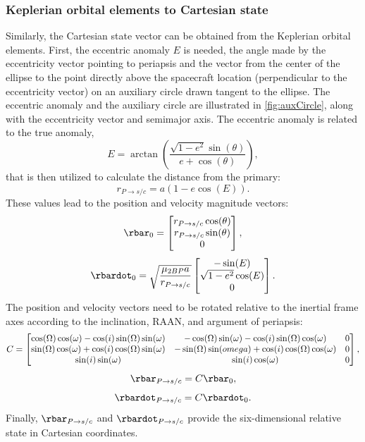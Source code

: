 \subsubsection{Keplerian orbital elements to Cartesian state}
Similarly, the Cartesian state vector can be obtained from the Keplerian orbital elements. First,
the eccentric anomaly $E$ is needed, the angle made by the eccentricity vector pointing to
periapsis and the vector from the center of the ellipse to the point directly above the spacecraft
location (perpendicular to the eccentricity vector) on an auxiliary circle drawn tangent to the
ellipse. The eccentric anomaly and the auxiliary circle are illustrated in \cref{fig:auxCircle},
along with the eccentricity vector and semimajor axis. The eccentric anomaly is related to the true
anomaly,
\begin{equation}
    E=\arctan(\frac{\sqrt{1-e^{2}}\sin(\theta)}{e+\cos(\theta)}),
    \label{eq:eccentricanomaly}
\end{equation}
that is then utilized to calculate the distance from the primary:
\begin{equation}
    r_{P\rightarrow s/c}=a(1-e\cos(E)).
    \label{eq:circularradius}
\end{equation}
These values lead to the position and velocity magnitude vectors:
\begin{equation}
    \rbar_{0}=\begin{bmatrix}r_{P\rightarrow s/c}\cos(\theta)\cr r_{P\rightarrow s/c}\sin(\theta)\cr0\end{bmatrix},
    \label{eq:circularpositionvector}
\end{equation}
\vspace{1mm}
\begin{equation}
    \rbardot_{0}=\sqrt{\frac{\mu_{2BP}a}{r_{P\rightarrow s/c}}}\begin{bmatrix}-\sin(E)\cr\sqrt{1-e^{2}}\cos(E)\cr0\end{bmatrix}.
    \label{eq:circularvelocityvector}
\end{equation}
The position and velocity vectors need to be rotated relative to the inertial frame axes according
to the inclination, RAAN, and argument of periapsis:
\begin{equation}
    C=\begin{bmatrix}\cos(\Omega)\cos(\omega)-\cos(i)\sin(\Omega)\sin(\omega)&-\cos(\Omega)\sin(\omega)-\cos(i)\sin(\Omega)\cos(\omega)&0\cr\sin(\Omega)\cos(\omega)+\cos(i)\cos(\Omega)\sin(\omega)&-\sin(\Omega)\sin(omega)+\cos(i)\cos(\Omega)\cos(\omega)&0\cr\sin(i)\sin(\omega)&\sin(i)\cos(\omega)&0\end{bmatrix},
    \label{eq:elementrotation}
\end{equation}
\vspace{1mm}
\begin{equation}
    \rbar_{P\rightarrow s/c}=C\rbar_{0},
    \label{eq:positionvector}
\end{equation}
\begin{equation}
    \rbardot_{P\rightarrow s/c}=C\rbardot_{0}.
    \label{eq:velocityvector}
\end{equation}
Finally, $\rbar_{P\rightarrow s/c}$ and $\rbardot_{P\rightarrow s/c}$ provide the six-dimensional
relative state in Cartesian coordinates.

